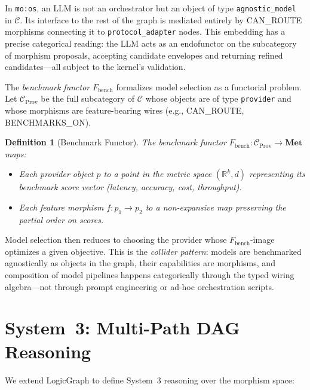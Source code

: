 \documentclass[submission,copyright,creativecommons]{eptcs}
\newtheorem{definition}{Definition}
\begin{document}
In \texttt{mo:os}, an LLM is not an orchestrator but an object of type
\texttt{agnostic\_model} in $\mathcal{C}$. Its interface to the rest of the
graph is mediated entirely by \textsc{CAN\_ROUTE} morphisms connecting it to
\texttt{protocol\_adapter} nodes. This embedding has a precise categorical
reading: the LLM acts as an endofunctor on the subcategory of morphism
proposals, accepting candidate envelopes and returning refined candidates---all
subject to the kernel's validation.

The \emph{benchmark functor} $F_{\mathrm{bench}}$ formalizes model selection as
a functorial problem. Let $\mathcal{C}_{\mathrm{Prov}}$ be the full
subcategory of $\mathcal{C}$ whose objects are of type \texttt{provider} and
whose morphisms are feature-bearing wires (e.g., \textsc{CAN\_ROUTE},
\textsc{BENCHMARKS\_ON}).

\begin{definition}[Benchmark Functor]
\label{def:benchmark-functor}
The benchmark functor $F_{\mathrm{bench}}\colon \mathcal{C}_{\mathrm{Prov}} \to
\mathbf{Met}$ maps:
\begin{itemize}
  \item Each provider object $p$ to a point in the metric space
        $(\mathbb{R}^k, d)$ representing its benchmark score vector (latency,
        accuracy, cost, throughput).
  \item Each feature morphism $f\colon p_1 \to p_2$ to a non-expansive map
        preserving the partial order on scores.
\end{itemize}
\end{definition}

Model selection then reduces to choosing the provider whose
$F_{\mathrm{bench}}$-image optimizes a given objective. This is the
\emph{collider pattern}: models are benchmarked agnostically as objects in the
graph, their capabilities are morphisms, and composition of model pipelines
happens categorically through the typed wiring algebra---not through prompt
engineering or ad-hoc orchestration scripts.

\section{System~3: Multi-Path DAG Reasoning}
\label{sec:system3}

We extend LogicGraph \cite{logicgraph2025} to define System~3 reasoning over
the morphism space:
\end{document}
